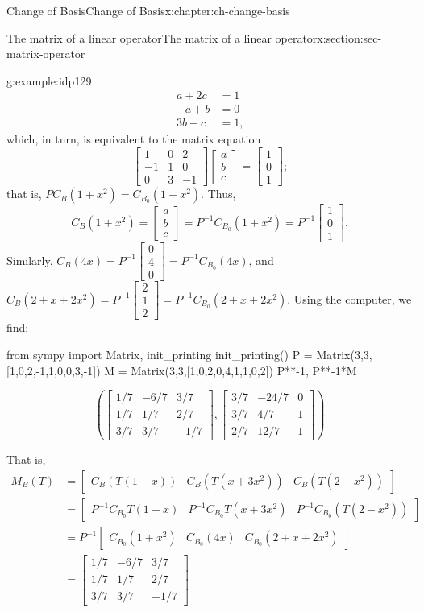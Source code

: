 \documentclass[oneside,10pt,]{book}
\numberwithin{equation}{section}
\newcommand{\bbm}{\begin{bmatrix}}
\newcommand{\ebm}{\end{bmatrix}}
\newcommand{\amp}{&}
\begin{document}
\begin{chapterptx}{Change of Basis}{}{Change of Basis}{}{}{x:chapter:ch-change-basis}
\begin{sectionptx}{The matrix of a linear operator}{}{The matrix of a linear operator}{}{}{x:section:sec-matrix-operator}
\begin{example}{}{g:example:idp129}
\begin{align*}
a+2c \amp =1\\
-a+b \amp =0\\
3b-c \amp =1\text{,}
\end{align*}
which, in turn, is equivalent to the matrix equation%
\begin{equation*}
\bbm 1\amp 0\amp 2\\-1\amp 1\amp 0\\0\amp 3\amp -1\ebm\bbm a\\b\\c\ebm = \bbm 1\\0\\1\ebm\text{;}
\end{equation*}
that is, \(PC_B(1+x^2) = C_{B_0}(1+x^2)\). Thus,%
\begin{equation*}
C_B(1+x^2) = \bbm a\\b\\c\ebm = P^{-1}C_{B_0}(1+x^2) = P^{-1}\bbm 1\\0\\1\ebm\text{.}
\end{equation*}
Similarly, \(C_B(4x)=P^{-1}\bbm 0\\4\\0\ebm = P^{-1}C_{B_0}(4x)\), and \(C_B(2+x+2x^2)=P^{-1}\bbm 2\\1\\2\ebm = P^{-1}C_{B_0}(2+x+2x^2)\). Using the computer, we find:%
\begin{sageinput}
from sympy import Matrix, init_printing
init_printing()
P = Matrix(3,3,[1,0,2,-1,1,0,0,3,-1])
M = Matrix(3,3,[1,0,2,0,4,1,1,0,2])
P**-1, P**-1*M
\end{sageinput}
\begin{sageoutput}
\[\left(\bbm 1/7\amp -6/7\amp 3/7\\1/7\amp 1/7\amp 2/7\\3/7\amp 3/7\amp -1/7\ebm, \bbm 3/7\amp -24/7\amp 0\\3/7\amp 4/7\amp 1\\2/7\amp 12/7\amp 1\ebm\right)\]
\end{sageoutput}
That is,%
\begin{align*}
M_B(T) \amp =\bbm C_B(T(1-x)) \amp C_B(T(x+3x^2)) \amp C_B(T(2-x^2))\ebm\\
\amp =\bbm P^{-1}C_{B_0}T(1-x) \amp P^{-1} C_{B_0}T(x+3x^2) \amp P^{-1}C_{B_0}(T(2-x^2))\ebm\\
\amp =P^{-1}\bbm C_{B_0}(1+x^2) \amp C_{B_0}(4x)\amp C_{B_0}(2+x+2x^2)\ebm\\
\amp =\bbm 1/7\amp -6/7\amp 3/7\\1/7\amp 1/7\amp 2/7\\3/7\amp 3/7\amp -1/7\ebm

\end{align*}
\end{example}
\end{sectionptx}
\end{chapterptx}
\end{document}
